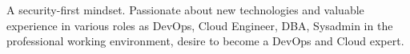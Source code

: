 

\begin{cvparagraph}

A security-first mindset. Passionate about new technologies and valuable experience in various roles as DevOps, Cloud Engineer, DBA, Sysadmin in the professional working environment, desire to become a DevOps and Cloud expert.
\end{cvparagraph}
